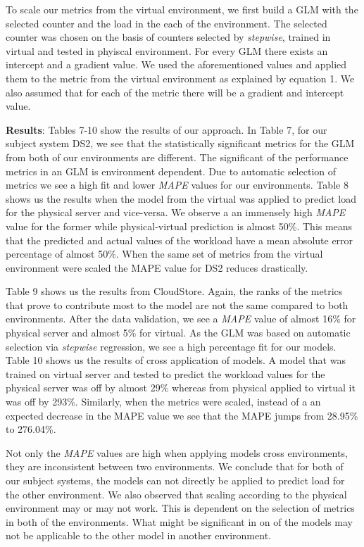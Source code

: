 To scale our metrics from the virtual environment, we first build a GLM with the selected counter and the load in the each of the environment. The selected counter was chosen on the basis of counters selected by \textit{stepwise}, trained in virtual and tested in phyiscal environment. For every GLM there exists an intercept and a gradient value. We used the aforementioned values and applied them to the metric from the virtual environment as explained by equation 1.
We also assumed that for each of the metric there will be a gradient and intercept value.


 
\textbf{Results}: Tables 7-10 show the results of our approach. In Table 7, for our subject system DS2, we see that the statistically significant metrics for the GLM from both of our environments are different. The significant of the performance metrics in an GLM is environment dependent. Due to automatic selection of metrics we see a high fit and lower \textit{MAPE} values for our environments. Table 8 shows us the results when the model from the virtual was applied to predict load for the physical server and vice-versa. We observe a an immensely high \textit{MAPE} value for the former while physical-virtual prediction is almost 50\%. This means that the predicted and actual values of the workload have a mean absolute error percentage of almost 50\%. When the same set of metrics from the virtual environment were scaled the MAPE value for DS2 reduces drastically.


Table 9 shows us the results from CloudStore. Again, the ranks of the metrics that prove to contribute most to the model are not the same compared to both environments. After the data validation, we see a \textit{MAPE} value of almost 16\% for physical server and almost 5\% for virtual. As the GLM was based on automatic selection via \textit{stepwise} regression, we see a high percentage fit for our models. 
Table 10 shows us the results of cross application of models. A model that was trained on virtual server and tested to predict the workload values for the physical server was off by almost 29\% whereas from physical applied to virtual it was off by 293\%. Similarly, when the metrics were scaled, instead of a an expected decrease in the MAPE value we see that the MAPE jumps from 28.95\% to 276.04\%.

Not only the \textit{MAPE} values are high when applying models cross environments, they are inconsistent between two environments. We conclude that for both of our subject systems, the models can not directly be applied to predict load for the other environment. We also observed that scaling according to the physical environment may or may not work. This is dependent on the selection of metrics in both of the environments. What might be significant in on of the models may not be applicable to the other model in another environment.




